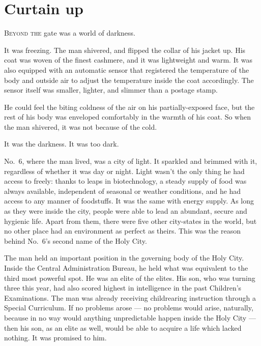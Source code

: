 
\chapter{Curtain up}


\lettrine{B}{eyond the} gate was a world of darkness.

It was freezing. The man shivered, and flipped the collar of his jacket
up. His coat was woven of the finest cashmere, and it was lightweight
and warm. It was also equipped with an automatic sensor that registered
the temperature of the body and outside air to adjust the temperature
inside the coat accordingly. The sensor itself was smaller, lighter, and
slimmer than a postage stamp.

He could feel the biting coldness of the air on his partially-exposed
face, but the rest of his body was enveloped comfortably in the warmth
of his coat. So when the man shivered, it was not because of the cold.

It was the darkness. It was too dark.

No.~6, where the man lived, was a city of light. It sparkled and brimmed
with it, regardless of whether it was day or night. Light wasn't the
only thing he had access to freely: thanks to leaps in biotechnology, a
steady supply of food was always available, independent of seasonal or
weather conditions, and he had access to any manner of foodstuffs. It
was the same with energy supply. As long as they were inside the city,
people were able to lead an abundant, secure and hygienic life. Apart
from them, there were five other city-states in the world, but no other
place had an environment as perfect as theirs. This was the reason
behind No.~6's second name of the Holy City.

The man held an important position in the governing body of the Holy
City. Inside the Central Administration Bureau, he held what was
equivalent to the third most powerful spot. He was an elite of the
elites. His son, who was turning three this year, had also scored
highest in intelligence in the past Children's Examinations. The man was
already receiving childrearing instruction through a Special Curriculum.
If no problems arose --- no problems would arise, naturally, because in no
way would anything unpredictable happen inside the Holy City --- then his
son, as an elite as well, would be able to acquire a life which lacked
nothing. It was promised to him.

